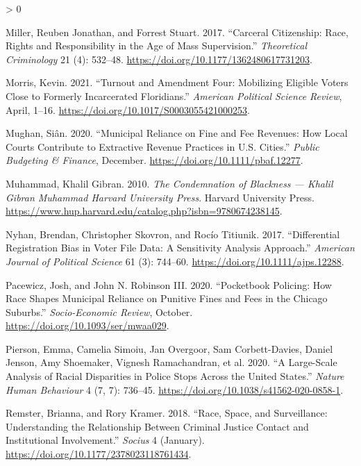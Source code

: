 \documentclass[
  12pt,
]{article}
\newlength{\cslhangindent}
\newenvironment{CSLReferences}[2] %
 {%
  \setlength{\parindent}{0pt}
  \ifodd #1 \everypar{\setlength{\hangindent}{\cslhangindent}}\ignorespaces\fi
  \ifnum #2 > 0
  \setlength{\parskip}{#2\baselineskip}
  \fi
 }%
 {}
\begin{document}
\begin{CSLReferences}{1}{0}
\leavevmode\hypertarget{ref-Miller2017}{}%
Miller, Reuben Jonathan, and Forrest Stuart. 2017. {``Carceral {Citizenship}: {Race}, {Rights} and {Responsibility} in the {Age} of {Mass Supervision}.''} \emph{Theoretical Criminology} 21 (4): 532--48. \url{https://doi.org/10.1177/1362480617731203}.

\leavevmode\hypertarget{ref-Morris2021}{}%
Morris, Kevin. 2021. {``Turnout and {Amendment Four}: {Mobilizing Eligible Voters Close} to {Formerly Incarcerated Floridians}.''} \emph{American Political Science Review}, April, 1--16. \url{https://doi.org/10.1017/S0003055421000253}.

\leavevmode\hypertarget{ref-Mughan2020}{}%
Mughan, Siân. 2020. {``Municipal {Reliance} on {Fine} and {Fee Revenues}: {How Local Courts Contribute} to {Extractive Revenue Practices} in {U}.{S}. {Cities}.''} \emph{Public Budgeting \& Finance}, December. \url{https://doi.org/10.1111/pbaf.12277}.

\leavevmode\hypertarget{ref-Muhammad2010}{}%
Muhammad, Khalil Gibran. 2010. \emph{The {Condemnation} of {Blackness} --- {Khalil Gibran Muhammad} \textbar{} {Harvard University Press}}. {Harvard University Press}. \url{https://www.hup.harvard.edu/catalog.php?isbn=9780674238145}.

\leavevmode\hypertarget{ref-Nyhan2017}{}%
Nyhan, Brendan, Christopher Skovron, and Rocío Titiunik. 2017. {``Differential {Registration Bias} in {Voter File Data}: {A Sensitivity Analysis Approach}.''} \emph{American Journal of Political Science} 61 (3): 744--60. \url{https://doi.org/10.1111/ajps.12288}.

\leavevmode\hypertarget{ref-Pacewicz2020}{}%
Pacewicz, Josh, and John N. Robinson III. 2020. {``Pocketbook Policing: {How} Race Shapes Municipal Reliance on Punitive Fines and Fees in the {Chicago} Suburbs.''} \emph{Socio-Economic Review}, October. \url{https://doi.org/10.1093/ser/mwaa029}.

\leavevmode\hypertarget{ref-Pierson2020}{}%
Pierson, Emma, Camelia Simoiu, Jan Overgoor, Sam Corbett-Davies, Daniel Jenson, Amy Shoemaker, Vignesh Ramachandran, et al. 2020. {``A Large-Scale Analysis of Racial Disparities in Police Stops Across the {United States}.''} \emph{Nature Human Behaviour} 4 (7, 7): 736--45. \url{https://doi.org/10.1038/s41562-020-0858-1}.

\leavevmode\hypertarget{ref-Remster2018a}{}%
Remster, Brianna, and Rory Kramer. 2018. {``Race, {Space}, and {Surveillance}: {Understanding} the {Relationship} Between {Criminal Justice Contact} and {Institutional Involvement}.''} \emph{Socius} 4 (January). \url{https://doi.org/10.1177/2378023118761434}.


\end{CSLReferences}
\end{document}
